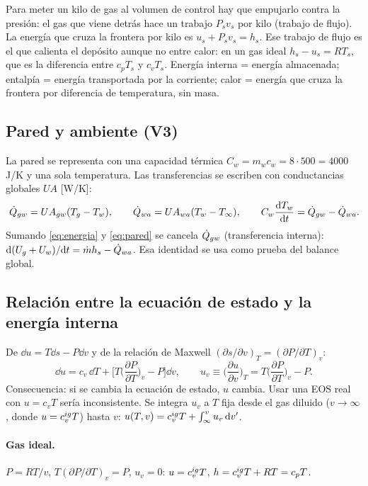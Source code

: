 \begin{idea}
Para meter un kilo de gas al volumen de control hay que empujarlo contra la presión: el gas que viene
detrás hace un trabajo $P_s v_s$ por kilo (trabajo de flujo). La energía que cruza la frontera por kilo es
$u_s+P_sv_s=h_s$. Ese trabajo de flujo es el que calienta el depósito aunque no entre calor:
en un gas ideal $h_s-u_s=RT_s$, que es la diferencia entre $c_pT_s$ y $c_vT_s$.
Energía interna = energía almacenada; entalpía = energía transportada por la corriente;
calor = energía que cruza la frontera por diferencia de temperatura, sin masa.
\end{idea}

\subsection{Pared y ambiente (V3)}
La pared se representa con una capacidad térmica $C_w=m_wc_w=8\cdot500=4000$ J/K y una sola temperatura.
Las transferencias se escriben con conductancias globales $UA$ [W/K]:
\begin{equation}\label{eq:pared}
\dot Q_{gw}=UA_{gw}(T_g-T_w),\qquad \dot Q_{wa}=UA_{wa}(T_w-T_\infty),\qquad C_w\frac{\mathrm{d} T_w}{\mathrm{d} t}=\dot Q_{gw}-\dot Q_{wa} .
\end{equation}
Sumando \eqref{eq:energia} y \eqref{eq:pared} se cancela $\dot Q_{gw}$ (transferencia interna):
$\mathrm{d}(U_g+U_w)/\mathrm{d} t=\dot m h_s-\dot Q_{wa}$. Esa identidad se usa como prueba del balance global.

\subsection{Relación entre la ecuación de estado y la energía interna}
De $\dd u=T\dd s-P\dd v$ y de la relación de Maxwell $(\partial s/\partial v)_T=(\partial P/\partial T)_v$:
\begin{equation}\label{eq:maxwell}
\dd u=c_v\,\dd T+\Big[T\Big(\frac{\partial P}{\partial T}\Big)_v-P\Big]\dd v ,
\qquad u_v\equiv\Big(\frac{\partial u}{\partial v}\Big)_T=T\Big(\frac{\partial P}{\partial T}\Big)_v-P .
\end{equation}
Consecuencia: si se cambia la ecuación de estado, $u$ cambia. Usar una EOS real con $u=c_vT$ sería
inconsistente. Se integra $u_v$ a $T$ fija desde el gas diluido ($v\to\infty$, donde $u=c_v^{ig} T$) hasta $v$:
$u(T,v)=c_v^{ig} T+\int_\infty^{v}u_v\,\mathrm{d} v'$.

\paragraph{Gas ideal.} $P=RT/v$, $T(\partial P/\partial T)_v=P$, $u_v=0$: $u=c_v^{ig} T$, $h=c_v^{ig} T+RT=c_pT$.

